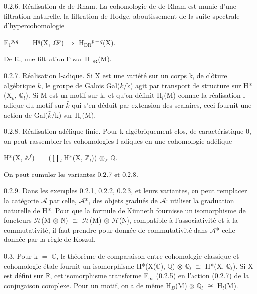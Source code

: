 \documentclass[10pt,twoside]{article}
\begin{document}
0.2.6. Réalisation de de Rham. La cohomologie de de Rham est munie d’une filtration naturelle, la filtration de Hodge, aboutissement de la suite spectrale d’hypercohomologie\par
E\ensuremath{_{1}}\ensuremath{^{p,q}} \ensuremath{=} H\ensuremath{^{q}}(X, \ensuremath{Ω}\ensuremath{^{p}}) \ensuremath{⇒} H\ensuremath{_{\mathrm{DR}}}\ensuremath{^{p+q}}(X).\par
De là, une filtration F sur H\ensuremath{_{\mathrm{DR}}}(M).\par
0.2.7. Réalisation l-adique. Si X est une variété sur un corps k, de clôture algébrique \ensuremath{\bar{k}}, le groupe de Galois Gal(\ensuremath{\bar{k}}/k) agit par transport de structure sur H*(X\ensuremath{_{\bar{k}}}, \ensuremath{ℚ}\ensuremath{_{l}}). Si M est un motif sur k, et qu’on définit H\ensuremath{_{l}}(M) comme la réalisation l-adique du motif sur \ensuremath{\bar{k}} qui s’en déduit par extension des scalaires, ceci fournit une action de Gal(\ensuremath{\bar{k}}/k) sur H\ensuremath{_{l}}(M).\par
0.2.8. Réalisation adélique finie. Pour k algébriquement clos, de caractéristique 0, on peut rassembler les cohomologies l-adiques en une cohomologie adélique\par
H*(X, \ensuremath{𝔸}\ensuremath{^{f}}) \ensuremath{=} (\ensuremath{∏}\ensuremath{_{l}} H*(X, \ensuremath{ℤ}\ensuremath{_{l}})) \ensuremath{⊗}\ensuremath{_{ℤ}} \ensuremath{ℚ}.\par
On peut cumuler les variantes 0.2.7 et 0.2.8.\par
0.2.9. Dans les exemples 0.2.1, 0.2.2, 0.2.3, et leurs variantes, on peut remplacer la catégorie \ensuremath{𝒜} par celle, \ensuremath{𝒜}*, des objets gradués de \ensuremath{𝒜}: utiliser la graduation naturelle de H*. Pour que la formule de Künneth fournisse un isomorphisme de foncteurs \ensuremath{ℋ}(M \ensuremath{⊗} N) \ensuremath{≅} \ensuremath{ℋ}(M) \ensuremath{⊗} \ensuremath{ℋ}(N), compatible à l’associativité et à la commutativité, il faut prendre pour donnée de commutativité dans \ensuremath{𝒜}* celle donnée par la règle de Koszul.\par
0.3. Pour k \ensuremath{=} \ensuremath{ℂ}, le théorème de comparaison entre cohomologie classique et cohomologie étale fournit un isomorphisme H*(X(\ensuremath{ℂ}), \ensuremath{ℚ}) \ensuremath{⊗} \ensuremath{ℚ}\ensuremath{_{l}} \ensuremath{≅} H*(X, \ensuremath{ℚ}\ensuremath{_{l}}). Si X est défini sur \ensuremath{ℝ}, cet isomorphisme transforme F\ensuremath{_{∞}} (0.2.5) en l’action (0.2.7) de la conjugaison complexe. Pour un motif, on a de même H\ensuremath{_{B}}(M) \ensuremath{⊗} \ensuremath{ℚ}\ensuremath{_{l}} \ensuremath{≅} H\ensuremath{_{l}}(M).\par
\end{document}
